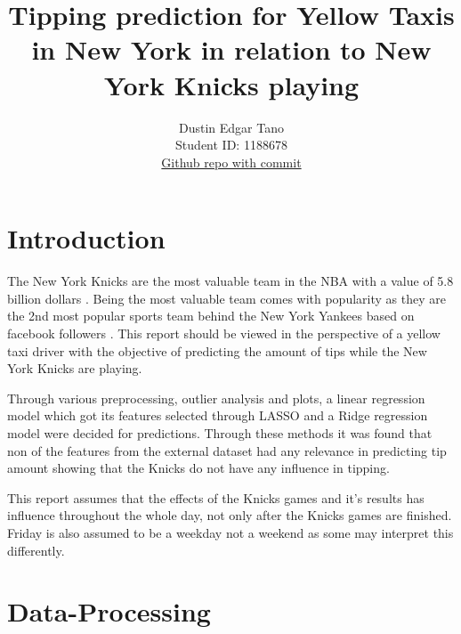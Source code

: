 \documentclass[11pt]{article}
\title{\textbf{Tipping prediction for Yellow Taxis in New York in relation to New York Knicks playing }}
\author{
Dustin Edgar Tano \\
Student ID: 1188678 \\
\href{https://github.com/MAST30034-Applied-Data-Science/mast30034-project-1-dustintano10.git}{Github repo with commit}
}
\begin{document}
\maketitle

\section{Introduction}

The New York Knicks are the most valuable team in the NBA with a value of 5.8 billion dollars \cite{2021-22mostvaluedteam}. Being the most valuable team comes with popularity as they are the 2nd most popular sports team behind the New York Yankees based on facebook followers \cite{2020mostpopularNYteams}. This report should be viewed in the perspective of a yellow taxi driver with the objective of predicting the amount of tips while the New York Knicks are playing.

Through various preprocessing, outlier analysis and plots, a linear regression model which got its features selected through LASSO and a Ridge regression model were decided for predictions. Through these methods it was found that non of the features from the external dataset had any relevance in predicting tip amount showing that the Knicks do not have any influence in tipping. 

This report assumes that the effects of the Knicks games and it's results has influence throughout the whole day, not only after the Knicks games are finished. Friday is also assumed to be a weekday not a weekend as some may interpret this differently.   

\section{Data-Processing}
\end{document}
